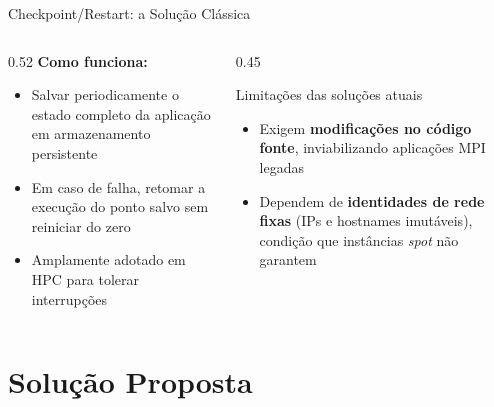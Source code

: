 \documentclass[brazil,aspectratio=169]{lapesd-slides}
\begin{document}
\begin{frame}{Checkpoint/Restart: a Solução Clássica}
    \begin{columns}
        \begin{column}{0.52\textwidth}
            \textbf{Como funciona:}
            \begin{itemize}
                \item Salvar periodicamente o estado completo da aplicação em armazenamento persistente
                \vspace{0.4em}
                \item Em caso de falha, retomar a execução do ponto salvo sem reiniciar do zero
                \vspace{0.4em}
                \item Amplamente adotado em HPC para tolerar interrupções
            \end{itemize}
        \end{column}
        \begin{column}{0.45\textwidth}
            \begin{alertblock}{Limitações das soluções atuais}
                \small
                \begin{itemize}
                    \item Exigem \textbf{modificações no código fonte}, inviabilizando aplicações MPI legadas
                    \vspace{0.3em}
                    \item Dependem de \textbf{identidades de rede fixas} (IPs e hostnames imutáveis), condição que instâncias \textit{spot} não garantem
                \end{itemize}
            \end{alertblock}
        \end{column}
    \end{columns}
\end{frame}

\showsections
\section{Solução Proposta}
\end{document}
